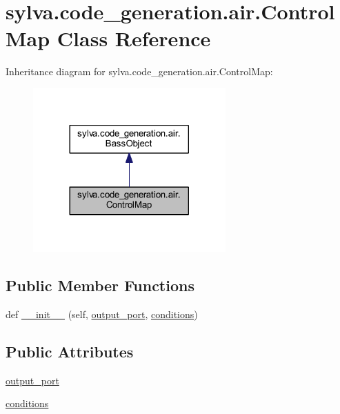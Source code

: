 \hypertarget{classsylva_1_1code__generation_1_1air_1_1_control_map}{}\section{sylva.\+code\+\_\+generation.\+air.\+Control\+Map Class Reference}
\label{classsylva_1_1code__generation_1_1air_1_1_control_map}


Inheritance diagram for sylva.\+code\+\_\+generation.\+air.\+Control\+Map\+:\nopagebreak
\begin{figure}[H]
\begin{center}
\leavevmode
\includegraphics[width=209pt]{classsylva_1_1code__generation_1_1air_1_1_control_map__inherit__graph}
\end{center}
\end{figure}
\subsection*{Public Member Functions}
\begin{DoxyCompactItemize}
\item 
def \hyperlink{classsylva_1_1code__generation_1_1air_1_1_control_map_a8b359dfc7d09c58ea64518d5cc69125c}{\+\_\+\+\_\+init\+\_\+\+\_\+} (self, \hyperlink{classsylva_1_1code__generation_1_1air_1_1_control_map_ab1eb2dd172ed3e35b4d93645aca8b340}{output\+\_\+port}, \hyperlink{classsylva_1_1code__generation_1_1air_1_1_control_map_ada7c102a2016403651c51193ba94dbc7}{conditions})
\end{DoxyCompactItemize}
\subsection*{Public Attributes}
\begin{DoxyCompactItemize}
\item 
\hyperlink{classsylva_1_1code__generation_1_1air_1_1_control_map_ab1eb2dd172ed3e35b4d93645aca8b340}{output\+\_\+port}
\item 
\hyperlink{classsylva_1_1code__generation_1_1air_1_1_control_map_ada7c102a2016403651c51193ba94dbc7}{conditions}
\end{DoxyCompactItemize}


